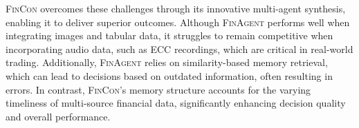 \textsc{FinCon} overcomes these challenges through its innovative multi-agent synthesis, enabling it to deliver superior outcomes. Although \textsc{FinAgent} performs well when integrating images and tabular data, it struggles to remain competitive when incorporating audio data, such as ECC recordings, which are critical in real-world trading. Additionally, \textsc{FinAgent} relies on similarity-based memory retrieval, which can lead to decisions based on outdated information, often resulting in errors. In contrast, \textsc{FinCon}'s memory structure accounts for the varying timeliness of multi-source financial data, significantly enhancing decision quality and overall performance.


